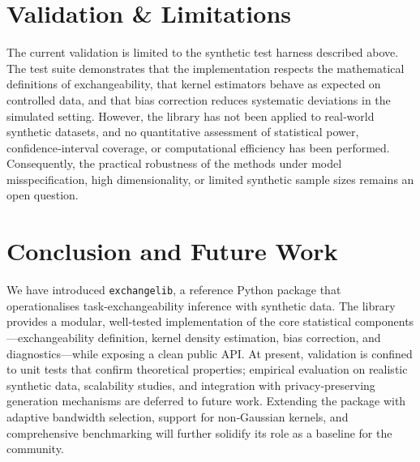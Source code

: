 \documentclass[11pt,a4paper]{article}
\begin{document}
\section{Validation \& Limitations}
The current validation is limited to the synthetic test harness described above.  The test suite demonstrates that the implementation respects the mathematical definitions of exchangeability, that kernel estimators behave as expected on controlled data, and that bias correction reduces systematic deviations in the simulated setting.  However, the library has not been applied to real‑world synthetic datasets, and no quantitative assessment of statistical power, confidence‑interval coverage, or computational efficiency has been performed.  Consequently, the practical robustness of the methods under model misspecification, high dimensionality, or limited synthetic sample sizes remains an open question.

\section{Conclusion and Future Work}
We have introduced \texttt{exchangelib}, a reference Python package that operationalises task‑exchangeability inference with synthetic data.  The library provides a modular, well‑tested implementation of the core statistical components—exchangeability definition, kernel density estimation, bias correction, and diagnostics—while exposing a clean public API.  At present, validation is confined to unit tests that confirm theoretical properties; empirical evaluation on realistic synthetic data, scalability studies, and integration with privacy‑preserving generation mechanisms are deferred to future work.  Extending the package with adaptive bandwidth selection, support for non‑Gaussian kernels, and comprehensive benchmarking will further solidify its role as a baseline for the community.



\end{document}
